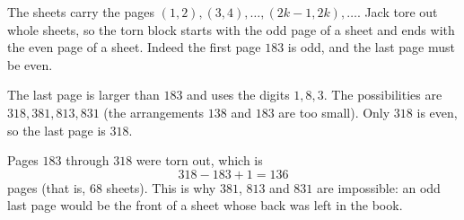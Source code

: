 The sheets carry the pages $(1,2),(3,4),\dots,(2k-1,2k),\dots$. Jack tore out whole sheets, so the torn block starts with the odd page of a sheet and ends with the even page of a sheet. Indeed the first page $183$ is odd, and the last page must be even.

The last page is larger than $183$ and uses the digits $1,8,3$. The possibilities are $318,381,813,831$ (the arrangements $138$ and $183$ are too small). Only $318$ is even, so the last page is $318$.

Pages $183$ through $318$ were torn out, which is
\[
318-183+1=\boxed{136}
\]
pages (that is, $68$ sheets). This is why $381$, $813$ and $831$ are impossible: an odd last page would be the front of a sheet whose back was left in the book.
